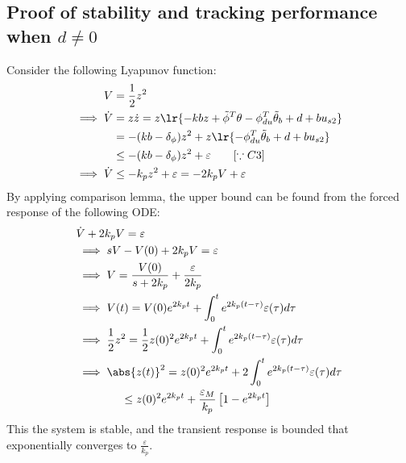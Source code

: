 \subsection{Proof of stability and tracking performance when $d \neq 0$}
Consider the following Lyapunov function:
\begin{align*}
    V &= \frac{1}{2} z^2\\
    \implies \dot V &= z \dot z = z \lr{-kbz + \tilde \phi^T \theta - \phi_{du}^T \tilde \theta_b + d + b u_{s2}}\\
    &= -(kb - \delta_{\phi})z^2 + z \lr{- \phi_{du}^T \tilde \theta_b + d + b u_{s2}}\\
    &\leq -(kb - \delta_{\phi}) z^2 + \varepsilon \qquad [\because C3] \\
    \implies \dot V &\leq -k_p z^2 + \varepsilon = - 2 k_p V + \varepsilon
\end{align*}
By applying comparison lemma, the upper bound can be found from the forced
response of the following ODE:
\begin{align*}
    &\dot V + 2 k_p V = \varepsilon\\
    &\implies sV - V(0) + 2 k_p V = \varepsilon\\
    &\implies V = \frac{V(0)}{s + 2 k_p} + \frac{\varepsilon}{2 k_p}\\
    &\implies V(t) = V(0)e^{2 k_p t} + \int_0^t{e^{2 k_p (t-\tau)} \varepsilon(\tau) d\tau}\\
    &\implies \frac{1}{2} z^2 = \frac{1}{2} z(0)^2 e^{2 k_p t} + \int_0^t{e^{2 k_p (t-\tau)} \varepsilon(\tau) d\tau}\\
    &\implies \abs{z(t)}^2 = z(0)^2 e^{2 k_p t} +2 \int_0^t{e^{2 k_p (t-\tau)} \varepsilon(\tau) d\tau}\\
    &\qquad \qquad \leq z(0)^2 e^{2 k_p t} + \frac{\varepsilon_M}{k_p} \left[1 -  e^{2 k_p t} \right]
\end{align*}
This the system is stable, and the transient response is bounded that
exponentially converges to $\frac{\varepsilon}{k_p}$.
